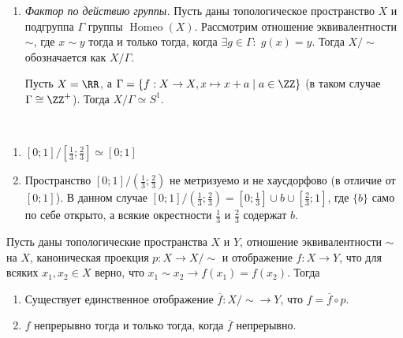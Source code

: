 \documentclass[12pt,a4paper]{article}
\DeclareMathOperator{\Homeo}{Homeo}
\begin{document}
\begin{definition}
\begin{enumerate}
            \item \emph{Фактор по действию группы.} Пусть даны топологическое пространство $X$ и подгруппа $\Gamma$ группы $\Homeo(X)$. Рассмотрим отношение эквивалентности $\sim$, где $x \sim y$ тогда и только тогда, когда $\exists g \in \Gamma:\; g(x) = y$. Тогда $X/{\sim}$ обозначается как $X/\Gamma$.
            \begin{example}
                Пусть $X = \RR$, а $\Gamma = \{f: X \to X, x \mapsto x + a \mid a \in \ZZ\}$ (в таком случае $\Gamma \cong \ZZ^+$). Тогда $X/\Gamma \simeq S^1$.
            \end{example}
        \end{enumerate}
    \end{definition}

    \begin{example}\ 
        \begin{enumerate}
            \item $[0; 1]/[\frac{1}{3}; \frac{2}{3}] \simeq [0; 1]$
            \item Пространство $[0; 1]/(\frac{1}{3}; \frac{2}{3})$ не метризуемо и не хаусдорфово (в отличие от $[0; 1]$). В данном случае $[0; 1]/(\frac{1}{3}; \frac{2}{3}) = [0; \frac{1}{3}] \cup {b} \cup [\frac{2}{3}; 1]$, где $\{b\}$ само по себе открыто, а всякие окрестности $\frac{1}{3}$ и $\frac{2}{3}$ содержат $b$.
        \end{enumerate}
    \end{example}

    \begin{theorem}
        Пусть даны топологические пространства $X$ и $Y$, отношение эквивалентности $\sim$ на $X$, каноническая проекция $p: X \to X/{\sim}$ и отображение $f: X \to Y$, что для всяких $x_1, x_2 \in X$ верно, что $x_1 \sim x_2 \rightarrow f(x_1) = f(x_2)$. Тогда
        \begin{enumerate}
            \item Существует единственное отображение $\overline{f}: X/{\sim} \to Y$, что $f = \overline{f} \circ p$.
            \item $f$ непрерывно тогда и только тогда, когда $\overline{f}$ непрерывно.
        \end{enumerate}
    \end{theorem}
\end{document}
